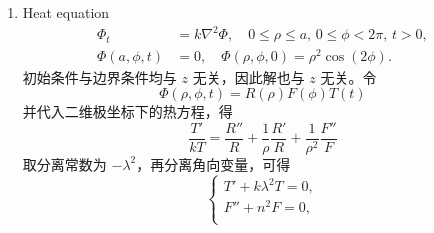 \documentclass[a4paper]{article}
\begin{document}
\begin{enumerate}
\begin{equation*}
        \end{equation*}
        解的形式可以写为
        \begin{equation*}
            \Phi(\rho, \phi, z) = \sum_{m=1}^{\infty} A_m J_0\left(\frac{m\pi}{L} \rho\right) \sin\left(\frac{m\pi z}{L}\right)
        \end{equation*}
        由 $\Phi(a, \phi, z) = 1$ 可得
        \begin{equation*}
            A_m = \frac{1}{J_0\left(\frac{m\pi}{L} a\right)}\frac{2(1-(-1)^{m})}{m\pi}
        \end{equation*}
        因此最终的解为
        \begin{equation*}
            \begin{aligned}
                \Phi(\rho, \phi, z) &= \sum_{m=1}^{\infty} \frac{2(1-(-1)^{m})}{m\pi}\frac{J_0\left(\frac{m\pi}{L}\rho\right)}{J_0\left(\frac{m\pi}{L} a\right)} \sin\left(\frac{m\pi z}{L}\right)\\
                &= \sum_{q=0}^{\infty} \frac{4}{(2q+1)\pi}\frac{J_0\left(\frac{(2q+1)\pi}{L}\rho\right)}{J_0\left(\frac{(2q+1)\pi}{L} a\right)} \sin\left(\frac{(2q+1)\pi z}{L}\right)
            \end{aligned}
        \end{equation*}
    \item[(c)] Heat equation
        \begin{align*}
            \Phi_t &= k \nabla^2 \Phi, \quad 0 \leq \rho \leq a, \, 0 \leq \phi < 2\pi, \, t > 0, \\
            \Phi(a, \phi, t) &= 0, \quad
            \Phi(\rho, \phi, 0) = \rho^2 \cos(2\phi).
        \end{align*}
        初始条件与边界条件均与 $z$ 无关，因此解也与 $z$ 无关。令
        \begin{equation*}
            \Phi(\rho, \phi, t) = R(\rho) F(\phi) T(t)
        \end{equation*}
        并代入二维极坐标下的热方程，得
        \begin{equation*}
            \frac{T'}{kT} = 
            \frac{R''}{R} + \frac{1}{\rho}\frac{R'}{R} + \frac{1}{\rho^2}\frac{F''}{F}
        \end{equation*}
        取分离常数为 $-\lambda^2$，再分离角向变量，可得
        \begin{equation*}
            \begin{cases}
                T'+k\lambda^2T=0, \\
                F''+n^2F=0,\\

\end{cases}
\end{equation*}
\end{enumerate}
\end{document}
